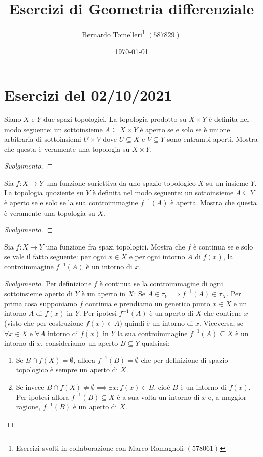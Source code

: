 \documentclass[a4paper, 12pt, italian]{article}
\title{Esercizi di Geometria differenziale}
\author{Bernardo Tomelleri\thanks{Esercizi svolti in collaborazione con Marco
Romagnoli $(578061)$} $(587829)$}
\date{\today}
\begin{document}
\maketitle

\section{Esercizi del 02/10/2021}
\begin{exercise}
Siano $X$ e $Y$ due spazi topologici. La topologia prodotto su $X \times Y$
è definita nel modo seguente: un sottoinsieme $A \subseteq X \times Y$ è
aperto se e solo se è unione arbitraria di sottoinsiemi $U \times V$ dove
$U \subseteq X$ e $V \subseteq Y$ sono entrambi aperti. Mostra che questa è
veramente una topologia su $X \times Y$.
\begin{proof}[Svolgimento]

\end{proof}
\end{exercise}

\begin{exercise}
Sia $f: X \to Y$ una funzione suriettiva da uno spazio topologico $X$ su
un insieme $Y.$ La topologia quoziente su $Y$ è definita nel modo seguente:
un sottoinsieme $A \subseteq Y$ è aperto se e solo se la sua controimmagine
$f^{-1}(A)$ è aperta. Mostra che questa è veramente una topologia su $X$.
\begin{proof}[Svolgimento]

\end{proof}
\end{exercise}

\begin{exercise}
Sia $f: X \to Y$ una funzione fra spazi topologici. Mostra che $f$ è
continua se e solo se vale il fatto seguente: per ogni $x \in X$ e per ogni
intorno $A$ di $f(x)$, la controimmagine $f^{-1}(A)$ è un intorno di $x$.
\begin{proof}[Svolgimento]
Per definizione $f$ è continua se la controimmagine di ogni sottoinsieme
aperto di $Y$ è un aperto in $X$:
Se $A \in \tau_Y \implies f^{-1}(A) \in \tau_X$. Per prima cosa supponiamo
$f$ continua e prendiamo un generico punto $x \in X$ e un intorno $A$ di $f(x)$
in $Y$. Per ipotesi $f^{-1}(A)$ è un aperto di $X$ che contiene $x$ (visto
che per costruzione $f(x) \in A$) quindi è un intorno di $x$.\newline
Viceversa, se $\forall x \in X$ e $\forall A$ intorno di $f(x)$ in $Y$ la sua
controimmagine $f^{-1}(A) \subseteq X$ è un intorno di $x$, consideriamo un
aperto $B \subseteq Y$ qualsiasi:
\begin{enumerate}
\item Se $B \cap f(X) = \emptyset$, allora $f^{-1}(B) = \emptyset$ che per
definizione di spazio topologico è sempre un aperto di $X$.
\item Se invece $B \cap f(X) \neq \emptyset \implies \exists x: f(x) \in B$,
cioè $B$ è un intorno di $f(x)$. Per ipotesi allora $f^{-1}(B) \subseteq X$ 
è a sua volta un intorno di $x$ e, a maggior ragione, $f^{-1}(B)$ è un
aperto di $X$.
\end{enumerate}
\end{proof}
\end{exercise}
\end{document}
